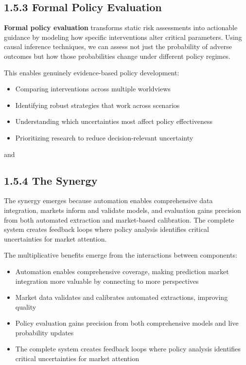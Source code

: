 \documentclass[
  11pt,
  letterpaper,
]{book}
\providecommand{\tightlist}{%
  \setlength{\itemsep}{0pt}\setlength{\parskip}{0pt}}
\begin{document}
\textcite{tetlock2015}

\subsection*{1.5.3 Formal Policy
Evaluation}\label{sec-policy-evaluation}

\textbf{Formal policy evaluation} transforms static risk assessments
into actionable guidance by modeling how specific interventions alter
critical parameters. Using causal inference techniques, we can assess
not just the probability of adverse outcomes but how those probabilities
change under different policy regimes.

This enables genuinely evidence-based policy development:

\begin{itemize}
\tightlist
\item
  Comparing interventions across multiple worldviews
\item
  Identifying robust strategies that work across scenarios
\item
  Understanding which uncertainties most affect policy effectiveness
\item
  Prioritizing research to reduce decision-relevant uncertainty
\end{itemize}

\textcite{pearl2000} and \textcite{pearl2009}

\subsection*{1.5.4 The Synergy}\label{sec-synergy}

The synergy emerges because automation enables comprehensive data
integration, markets inform and validate models, and evaluation gains
precision from both automated extraction and market-based calibration.
The complete system creates feedback loops where policy analysis
identifies critical uncertainties for market attention.

The multiplicative benefits emerge from the interactions between
components:

\begin{itemize}
\tightlist
\item
  Automation enables comprehensive coverage, making prediction market
  integration more valuable by connecting to more perspectives
\item
  Market data validates and calibrates automated extractions, improving
  quality
\item
  Policy evaluation gains precision from both comprehensive models and
  live probability updates
\item
  The complete system creates feedback loops where policy analysis
  identifies critical uncertainties for market attention
\end{itemize}
\end{document}
